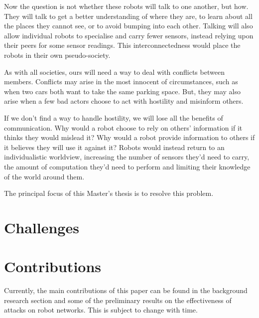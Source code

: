 Now the question is not whether these robots will talk to one another, but how. They will talk to get a better understanding of where they are, to learn about all the places they cannot see, or to avoid bumping into each other. Talking will also allow individual robots to specialise and carry fewer sensors, instead relying upon their peers for some sensor readings. This interconnectedness would place the robots in their own pseudo-society.

As with all societies, ours will need a way to deal with conflicts between members. Conflicts may arise in the most innocent of circumstances, such as when two cars both want to take the same parking space. But, they may also arise when a few bad actors choose to act with hostility and misinform others.


If we don't find a way to handle hostility, we will lose all the benefits of communication. Why would a robot choose to rely on others' information if it thinks they would mislead it? Why would a robot provide information to others if it believes they will use it against it? Robots would instead return to an individualistic worldview, increasing the number of sensors they'd need to carry, the amount of computation they'd need to perform and limiting their knowledge of the world around them. 

\centerline{The principal focus of this Master's thesis is to resolve this problem.}

\section{Challenges}
\section{Contributions}
Currently, the main contributions of this paper can be found in the background research section and some of the preliminary results on the effectiveness of attacks on robot networks. This is subject to change with time.